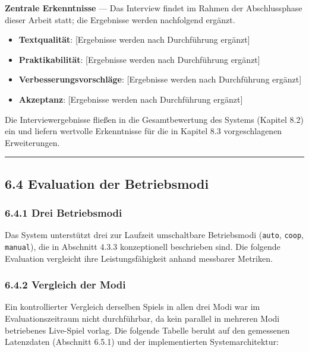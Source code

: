 \textbf{Zentrale Erkenntnisse} --- Das Interview findet im Rahmen der
Abschlussphase dieser Arbeit statt; die Ergebnisse werden nachfolgend
ergänzt.

\begin{itemize}
\tightlist
\item
  \textbf{Textqualität}: {[}Ergebnisse werden nach Durchführung
  ergänzt{]}
\item
  \textbf{Praktikabilität}: {[}Ergebnisse werden nach Durchführung
  ergänzt{]}
\item
  \textbf{Verbesserungsvorschläge}: {[}Ergebnisse werden nach
  Durchführung ergänzt{]}
\item
  \textbf{Akzeptanz}: {[}Ergebnisse werden nach Durchführung ergänzt{]}
\end{itemize}

Die Interviewergebnisse fließen in die Gesamtbewertung des Systems
(Kapitel 8.2) ein und liefern wertvolle Erkenntnisse für die in Kapitel
8.3 vorgeschlagenen Erweiterungen.

\begin{center}\rule{0.5\linewidth}{0.5pt}\end{center}

\subsection{6.4 Evaluation der
Betriebsmodi}\label{evaluation-der-betriebsmodi}

\subsubsection{6.4.1 Drei Betriebsmodi}\label{drei-betriebsmodi}

Das System unterstützt drei zur Laufzeit umschaltbare Betriebsmodi
(\passthrough{\lstinline!auto!}, \passthrough{\lstinline!coop!},
\passthrough{\lstinline!manual!}), die in Abschnitt 4.3.3 konzeptionell
beschrieben sind. Die folgende Evaluation vergleicht ihre
Leistungsfähigkeit anhand messbarer Metriken.

\subsubsection{6.4.2 Vergleich der Modi}\label{vergleich-der-modi}

Ein kontrollierter Vergleich derselben Spiels in allen drei Modi war im
Evaluationszeitraum nicht durchführbar, da kein parallel in mehreren
Modi betriebenes Live-Spiel vorlag. Die folgende Tabelle beruht auf den
gemessenen Latenzdaten (Abschnitt 6.5.1) und der implementierten
Systemarchitektur:

